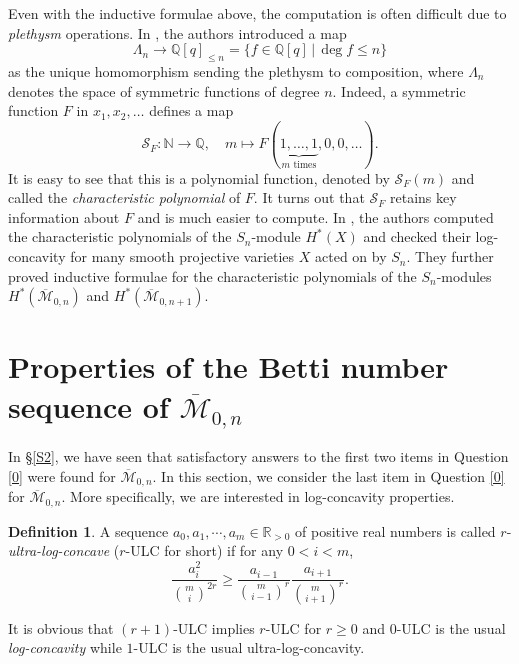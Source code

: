 \documentclass[11pt,letterpaper]{amsart}
\numberwithin{equation}{section}
\theoremstyle{definition}
\newtheorem{definition}[theorem]{Definition}
\def\QQ{\mathbb{Q}}
\def\RR{\mathbb{R}}
\newcommand{\cal}{\mathcal}
\def\cM{{\cal M}}
\def\cS{{\cal S}}
\def\ocM{\overline{\cM}}
\def\mzn{\overline{\cM}_{0,n} }
\def\lra{\longrightarrow }
\def\beq{\begin{equation}}
\def\eeq{\end{equation}}
\begin{document}
Even with the inductive formulae above, the computation is often  difficult due to \emph{plethysm} operations.
In \cite{CKL3}, the authors introduced a map $$\Lambda_n\lra \QQ[q]_{\le n}=\{f\in \QQ[q]\,|\, \deg f\le n\}$$ as the unique homomorphism sending the plethysm to composition, where $\Lambda_n$ denotes the space of symmetric functions of degree $n$. Indeed, a symmetric function $F$ in $x_1,x_2,\dots$ defines a map $$\cS_F: \mathbb{N} \lra \QQ, \quad m \mapsto F(\underbrace{1, \dots, 1}_{m \text{ times}}, 0, 0, \dots).$$
It is easy to see that this is a polynomial function, denoted by $\cS_F(m)$ and called the \emph{characteristic polynomial} of $F$.
It turns out that $\cS_F$ retains key information about $F$ and is much easier to compute.
In \cite{CKL3}, the authors computed the characteristic polynomials of the $S_n$-module $H^*(X)$ and checked their log-concavity for many smooth projective varieties $X$ acted on by $S_n$. They further proved inductive formulae for the characteristic polynomials of the $S_n$-modules $H^*(\mzn)$ and $H^*(\ocM_{0,n+1})$.







\bigskip
\section{Properties of the Betti number sequence of $\mzn$}\label{S3}

In \S\ref{S2}, we have seen that satisfactory answers to the first two items in Question \ref{0} were found for $\mzn$. In this section, we consider the last item in Question \ref{0} for $\mzn$. More specifically, we are interested in  log-concavity properties.

\begin{definition}
A sequence $a_0,a_1,\cdots,a_m\in \RR_{>0}$ of positive real numbers is called $r$-\emph{ultra-log-concave} ($r$-ULC for short) if for any $0<i<m$,
\beq\label{11}
\frac{a_i^2}{\binom{m}{i}^{2r}}\ge \frac{a_{i-1}}{\binom{m}{i-1}^r} \frac{a_{i+1}}{\binom{m}{i+1}^r}.
\eeq
\end{definition}
It is obvious that $(r+1)$-ULC implies $r$-ULC for $r\ge 0$ and $0$-ULC is the usual \emph{log-concavity} while $1$-ULC is the usual ultra-log-concavity.
\end{document}
